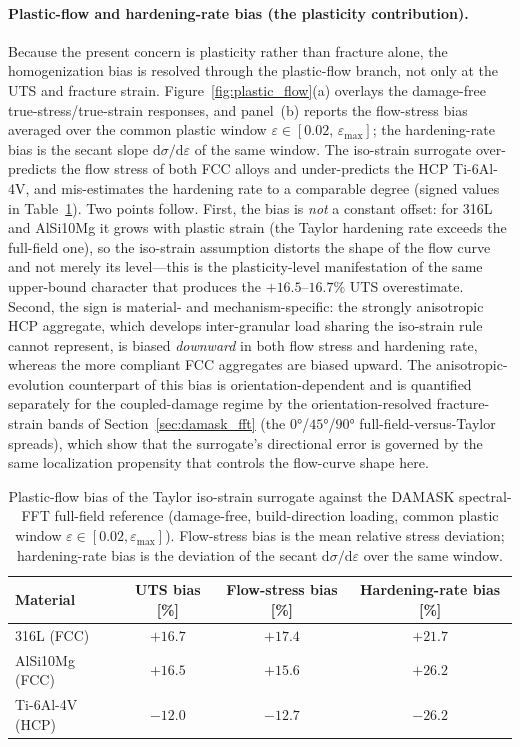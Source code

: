 \documentclass[12pt,a4paper,twocolumn]{article}
\begin{document}
\paragraph{Plastic-flow and hardening-rate bias (the plasticity contribution).}
Because the present concern is plasticity rather than fracture alone, the homogenization bias is resolved through the plastic-flow branch, not only at the UTS and fracture strain. Figure~\ref{fig:plastic_flow}(a) overlays the damage-free true-stress/true-strain responses, and panel~(b) reports the flow-stress bias averaged over the common plastic window $\varepsilon\in[0.02,\,\varepsilon_{\max}]$; the hardening-rate bias is the secant slope $\mathrm{d}\sigma/\mathrm{d}\varepsilon$ of the same window. The iso-strain surrogate over-predicts the flow stress of both FCC alloys and under-predicts the HCP Ti-6Al-4V, and mis-estimates the hardening rate to a comparable degree (signed values in Table~\ref{tab:plastic_flow_bias}). Two points follow. First, the bias is \emph{not} a constant offset: for 316L and AlSi10Mg it grows with plastic strain (the Taylor hardening rate exceeds the full-field one), so the iso-strain assumption distorts the shape of the flow curve and not merely its level---this is the plasticity-level manifestation of the same upper-bound character that produces the $+16.5$--$16.7\%$ UTS overestimate. Second, the sign is material- and mechanism-specific: the strongly anisotropic HCP aggregate, which develops inter-granular load sharing the iso-strain rule cannot represent, is biased \emph{downward} in both flow stress and hardening rate, whereas the more compliant FCC aggregates are biased upward. The anisotropic-evolution counterpart of this bias is orientation-dependent and is quantified separately for the coupled-damage regime by the orientation-resolved fracture-strain bands of Section~\ref{sec:damask_fft} (the $\ang{0}$/$\ang{45}$/$\ang{90}$ full-field-versus-Taylor spreads), which show that the surrogate's directional error is governed by the same localization propensity that controls the flow-curve shape here.

\begin{table}[htbp]
\centering
\caption{Plastic-flow bias of the Taylor iso-strain surrogate against the DAMASK spectral-FFT full-field reference (damage-free, build-direction loading, common plastic window $\varepsilon\in[0.02,\varepsilon_{\max}]$). Flow-stress bias is the mean relative stress deviation; hardening-rate bias is the deviation of the secant $\mathrm{d}\sigma/\mathrm{d}\varepsilon$ over the same window.}
\label{tab:plastic_flow_bias}
\footnotesize
\setlength{\tabcolsep}{4pt}
\begin{tabular}{lccc}
\toprule
\textbf{Material} & \textbf{UTS bias [\%]} & \textbf{Flow-stress bias [\%]} & \textbf{Hardening-rate bias [\%]} \\
\midrule
316L (FCC)      & $+16.7$ & $+17.4$ & $+21.7$ \\
AlSi10Mg (FCC)  & $+16.5$ & $+15.6$ & $+26.2$ \\
Ti-6Al-4V (HCP) & $-12.0$ & $-12.7$ & $-26.2$ \\
\bottomrule
\end{tabular}
\end{table}
\end{document}
